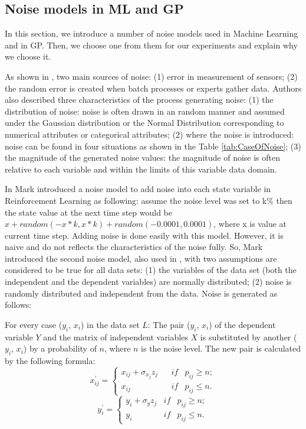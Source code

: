 \subsection {Noise models in ML and GP}
\label{Noi}
In this section, we introduce a number of noise models used  in Machine Learning and in GP. Then, we choose one from them for our experiments and explain why we choose it. \par
As shown in \cite{2010Dav}, two main sources of noise: (1) error in measurement of sensors; (2) the random error is created when batch processes or experts gather data. Authors also described three characteristics of the process generating noise: (1) the distribution of noise: noise is often drawn in an random manner and assumed under the Gaussian distribution or the Normal Distribution corresponding to numerical attributes or categorical attributes; (2) where the noise is introduced: noise can be found in four situations as shown in the Table \ref{tab:CaseOfNoise}; (3) the magnitude of the generated noise values: the magnitude of noise is often relative to each variable and within the limits of this variable data domain.\par
In \cite{1994Mark} Mark introduced a noise model to add noise into each state variable in Reinforcement Learning as following: assume the noise level was set to k\% then the state value at the next time step  would be $x + random (-x*k,x*k) + random(-0.0001,0.0001)$, where x is value at current time step. Adding noise is done easily with this model. However, it is naive and do not reflects the characteristics of the noise fully. So, Mark introduced the second noise model, also used in \cite{2003Eli}, with two assumptions are considered to be true for all data sets: (1) the variables of the data set (both the independent and the dependent variables) are normally distributed; (2) noise is randomly distributed and independent from the data. Noise is generated as follows: \par
For every case ($y_{i}$, $x_{i}$) in the data set $L$: The pair ($y_{i}$, $x_{i}$) of the dependent variable $Y$ and the matrix of independent variables $X$ is substituted by another ($y_{i}$, $x_{i}$) by a probability of $n$, where $n$ is the noise level. The new pair is calculated by the following formula:
$$ x_{ij}^{'} = \left\{ \begin{array}{llll}
x_{ij}+\sigma_{x_{j}}z_{j} &  & if & p_{ij}\geq n ;\\
x_{ij} &  &if & p_{ij} \le n .\end{array} \right.
$$
$$
y_{i}^{'} = \left\{ \begin{array}{lll}
y_{i}+\sigma_{y}z_{j} &  if & p_{ij}\geq n ;\\
y_{i} &if &p_{ij} \le n .\end{array} \right. $$

